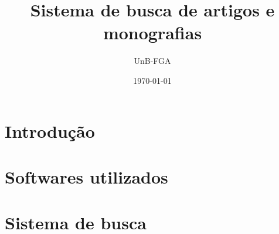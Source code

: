 \documentclass[12pt]{article}
\title{Sistema de busca de artigos e monografias}
\author{UnB-FGA}
\date{\today}
\begin{document}
\maketitle{}

\tableofcontents

\clearpage
\newpage

\section{Introdução}


 \clearpage
 \newpage
\section{Softwares utilizados}

 \clearpage
 \newpage
 \section{Sistema de busca}











\end{document}
